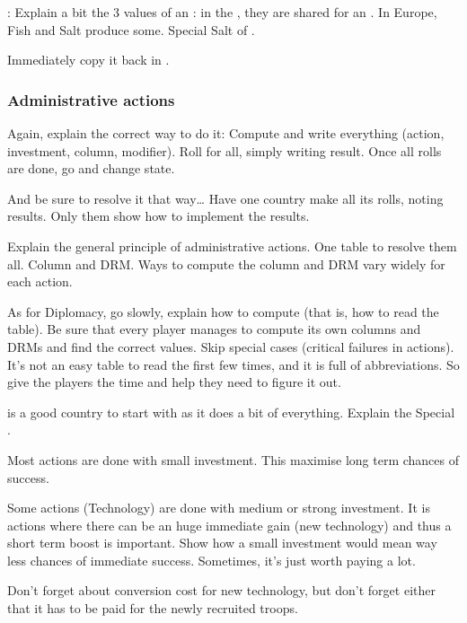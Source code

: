 \bparag {}: Explain a bit the 3 values of an \Area
\bparag {}: in the \ROTW, they are shared for
an \Area. In Europe, Fish and Salt \MNU produce some. Special Salt \MNU of
\VEN.

 Immediately copy it back in .

\subsubsection{Administrative actions}
\aparag Again, explain the correct way to do it:
\bparag Compute and write everything (action, investment, column, modifier).
\bparag Roll for all, simply writing result.
\bparag Once all rolls are done, go and change state.

\aparag And be sure to resolve it that way\ldots
\bparag Have one country make all its rolls, noting results.
\bparag Only them show how to implement the results.

\aparag Explain the general principle of administrative actions.
\bparag One table to resolve them all. Column and DRM.
\bparag Ways to compute the column and DRM vary widely for each action.

\aparag As for Diplomacy, go slowly, explain how to compute (that is, how to
read the table). Be sure that every player manages to compute its own columns
and DRMs and find the correct values.
\bparag Skip special cases (critical failures in \ROTW actions).
\bparag It's not an easy table to read the first few times, and it is full of
abbreviations. So give the players the time and help they need to figure it
out.

\aparag \POR is a good country to start with as it does a bit of everything.
\bparag Explain the Special \FTI.

\aparag Most actions are done with small investment.
\bparag This maximise long term chances of success.

\aparag Some actions (Technology) are done with medium or strong investment.
\bparag It is actions where there can be an huge immediate gain (new
technology) and thus a short term boost is important.
\bparag Show how a small investment would mean way less chances of immediate
success.
\bparag Sometimes, it's just worth paying a lot.

\aparag Don't forget about conversion cost for new technology, but don't
forget either that it has to be paid for the newly recruited troops.

